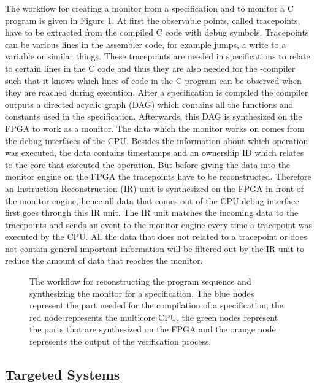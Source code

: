 The workflow for creating a monitor from a \tessla specification and to monitor a C program is given in Figure \ref{fig:workflow}. At first the observable points, called tracepoints, have to be extracted from the compiled C code with debug symbols. Tracepoints can be various lines in the assembler code, for example jumps, a write to a variable or similar things. These tracepoints are needed in \tessla specifications to relate to certain lines in the C code and thus they are also needed for the \tessla-compiler such that it knows which lines of code in the C program can be observed when they are reached during execution. After a \tessla specification is compiled the compiler outputs a directed acyclic graph (DAG) which contains all the functions and constants used in the specification. Afterwards, this DAG is synthesized on the FPGA to work as a monitor. The data which the monitor works on comes from the debug interfaces of the CPU. Besides the information about which operation was executed, the data contains timestamps and an ownership ID which relates to the core that executed the operation. But before giving the data into the monitor engine on the FPGA the tracepoints have to be reconstructed. Therefore an Instruction Reconstruction (IR) unit is synthesized on the FPGA in front of the monitor engine, hence all data that comes out of the CPU debug interface first goes through this IR unit. The IR unit matches the incoming data to the tracepoints and sends an event to the monitor engine every time a tracepoint was executed by the CPU. All the data that does not related to a tracepoint or does not contain general important information will be filtered out by the IR unit to reduce the amount of data that reaches the monitor.

\begin{figure}
	
	\caption{The workflow for reconstructing the program sequence and synthesizing the monitor for a \tessla specification. The blue nodes represent the part needed for the compilation of a \tessla specification, the red node represents the multicore CPU, the green nodes represent the parts that are synthesized on the FPGA and the orange node represents the output of the verification process. \label{fig:workflow}}
\end{figure}

\subsection{Targeted Systems}

